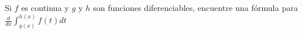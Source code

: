 \item Si $f$ es continua y $g$ y $h$ son funciones diferenciables, encuentre una fórmula para $\frac{d}{dx} \int_{g(x)}^{h(x)} f(t) dt$
